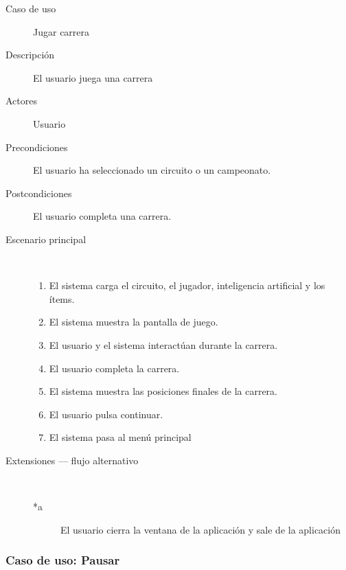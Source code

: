 \begin{description}
    \item[Caso de uso] Jugar carrera
    \item[Descripción] El usuario juega una carrera
    \item[Actores] Usuario
    \item[Precondiciones] El usuario ha seleccionado un circuito o un campeonato.
    \item[Postcondiciones] El usuario completa una carrera.
    \item[Escenario principal] $\quad$
        \begin{enumerate}
            \item El sistema carga el circuito, el jugador, inteligencia artificial y los ítems.
            \item El sistema muestra la pantalla de juego.
            \item El usuario y el sistema interactúan durante la carrera.
            \item El usuario completa la carrera.
            \item El sistema muestra las posiciones finales de la carrera.
            \item El usuario pulsa continuar.
            \item El sistema pasa al menú principal
        \end{enumerate}
    \item[Extensiones --- flujo alternativo] $\quad$
        \begin{description}
            \item[*a ] El usuario cierra la ventana de la aplicación y sale de la aplicación
        \end{description}
\end{description}

\subsubsection{Caso de uso: Pausar}

